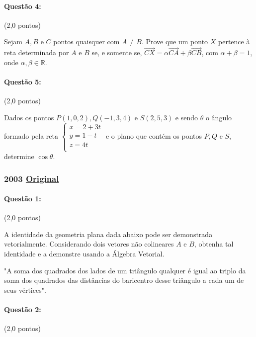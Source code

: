 \documentclass[12pt,a4paper]{article}
\newcommand{\original}[1]{\tiny \href{#1}{Original} \normalsize}
\begin{document}
\paragraph{Questão 4:} (2,0 pontos)

Sejam $A,B$ e $C$ pontos quaisquer com $A\neq B$. Prove que um ponto $X$ pertence à reta determinada por $A$ e $B$ se, e somente se, $\overrightarrow{CX}=\alpha \overrightarrow{CA}+\beta \overrightarrow{CB}$, com $\alpha+\beta=1$, onde $\alpha,\beta \in \mathbb{R}$.

\paragraph{Questão 5:} (2,0 pontos)

Dados os pontos $P(1,0,2),Q(-1,3,4)$ e $S(2,5,3)$ e sendo $\theta$ o ângulo formado pela reta $\begin{cases}
x=2+3t \\
y=1-t  \\
z=4t   \\
\end{cases}$
e o plano que contém os pontos $P,Q$ e $S$, determine $\cos\theta$.
\newpage
\footnotesize
\subsubsection{2003 \original{https://drive.google.com/file/d/138JIQV5mLv4zY-iHUJ274VbzcvAllqii/view?usp=sharing}}

\paragraph{Questão 1:} (2,0 pontos)

A identidade da geometria plana dada abaixo pode ser demonstrada vetorialmente. Considerando dois vetores não colineares $A$ e $B$, obtenha tal identidade e a demonstre usando a Álgebra Vetorial.

"A soma dos quadrados dos lados de um triângulo qualquer é igual ao triplo da soma dos quadrados das distâncias do baricentro desse triângulo a cada um de seus vértices".

\paragraph{Questão 2:} (2,0 pontos)
\end{document}
